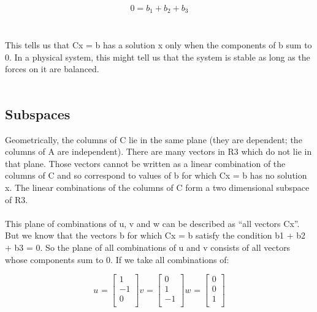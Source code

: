 \documentclass{article}
\begin{document}
\begin{center}
\begin{align}
    0 = b_1+b_2+b_3\nonumber\\
    \nonumber
\end{align}
\end{center}
\\
This tells us that Cx = b has a solution x only when the components of b sum to 0. In a physical system, this might tell us that the system is stable as long as
the forces on it are balanced. 
\\\\



\subsection{Subspaces}

Geometrically, the columns of C lie in the same plane (they are dependent; the
columns of A are independent). There are many vectors in R3 which do not lie
in that plane. Those vectors cannot be written as a linear combination of the
columns of C and so correspond to values of b for which Cx = b has no solution x. The linear combinations of the columns of C form a two dimensional
subspace of R3.\\\\
This plane of combinations of u, v and w can be described as “all vectors
Cx”. But we know that the vectors b for which Cx = b satisfy the condition
b1 + b2 + b3 = 0. So the plane of all combinations of u and v consists of all
vectors whose components sum to 0.
If we take all combinations of:
\\


\begin{center}
\[
  u_{} = 
  \begin{bmatrix}
    1\\
    -1\\
    0\\
  \end{bmatrix}
    v_{} = 
  \begin{bmatrix}
    0\\
    1\\
    -1\\
  \end{bmatrix}
   w_{} = 
  \begin{bmatrix}
    0\\
    0\\
    1\\
  \end{bmatrix}
\]
\end{center}
\end{document}
